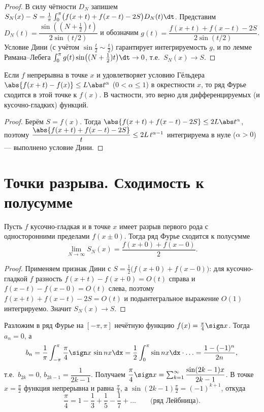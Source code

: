 \begin{proof}
В силу чётности $D_N$ запишем
$S_N(x)-S=\tfrac1\pi\int_0^{\pi}\bigl(f(x+t)+f(x-t)-2S\bigr)D_N(t)\dt$. Представим
$D_N(t)=\dfrac{\sin((N+\frac12)t)}{2\sin(t/2)}$ и обозначим
$g(t)=\dfrac{f(x+t)+f(x-t)-2S}{2\sin(t/2)}$. Условие Дини (с учётом $\sin\tfrac t2\sim\tfrac t2$)
гарантирует интегрируемость $g$, и по лемме Римана--Лебега
$\int_0^\pi g(t)\sin\bigl((N+\tfrac12)t\bigr)\dt\to0$, т.е.\ $S_N(x)\to S$.
\end{proof}

\begin{theorem}
Если $f$ непрерывна в точке $x$ и удовлетворяет условию Гёльдера
$\abs{f(x+t)-f(x)}\le L\abs t^{\alpha}$ ($0<\alpha\le1$) в окрестности $x$, то ряд Фурье сходится
в этой точке к $f(x)$. В частности, это верно для дифференцируемых (и кусочно-гладких) функций.
\end{theorem}

\begin{proof}
Берём $S=f(x)$. Тогда $\abs{f(x+t)+f(x-t)-2S}\le 2L\abs t^\alpha$, поэтому
$\dfrac{\abs{f(x+t)+f(x-t)-2S}}{t}\le 2L\,t^{\alpha-1}$ интегрируема в нуле ($\alpha>0$) —
выполнено условие Дини.
\end{proof}

\section{Точки разрыва. Сходимость к полусумме}

\begin{theorem}
Пусть $f$ кусочно-гладкая и в точке $x$ имеет разрыв первого рода с односторонними пределами
$f(x\pm0)$. Тогда ряд Фурье сходится к полусумме
\[
  \lim_{N\to\infty}S_N(x)=\frac{f(x+0)+f(x-0)}{2}.
\]
\end{theorem}

\begin{proof}
Применяем признак Дини с $S=\tfrac12\bigl(f(x+0)+f(x-0)\bigr)$: для кусочно-гладкой $f$ разность
$f(x+t)-f(x+0)=O(t)$ справа и $f(x-t)-f(x-0)=O(t)$ слева, поэтому
$f(x+t)+f(x-t)-2S=O(t)$ и подынтегральное выражение $O(1)$ интегрируемо. Значит $S_N(x)\to S$.
\end{proof}

\begin{example}
Разложим в ряд Фурье на $[-\pi,\pi]$ нечётную функцию $f(x)=\tfrac\pi4\sign x$. Тогда $a_n=0$, а
\[
  b_n=\frac1\pi\int_{-\pi}^{\pi}\frac\pi4\sign x\,\sin nx\dx
   =\frac12\int_0^{\pi}\sin nx\dx\cdot\ldots=\frac{1-(-1)^n}{2n},
\]
т.е.\ $b_{2k}=0$, $b_{2k-1}=\dfrac{1}{2k-1}$. Получаем
$\dfrac\pi4\sign x=\sum_{k=1}^\infty\dfrac{\sin(2k-1)x}{2k-1}$. В точке $x=\tfrac\pi2$ функция
непрерывна и равна $\tfrac\pi4$, а $\sin(2k-1)\tfrac\pi2=(-1)^{k+1}$, откуда
\[
  \frac\pi4=1-\frac13+\frac15-\frac17+\dots \qquad\text{(ряд Лейбница).}
\]
\end{example}

